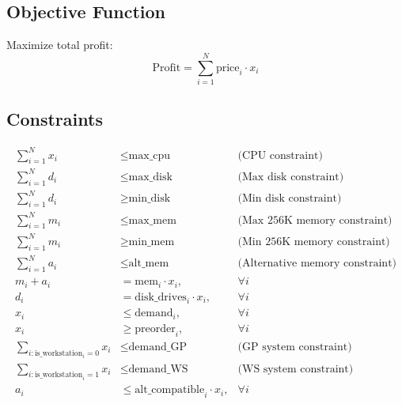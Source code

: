 \documentclass{article}
\begin{document}
\subsection*{Objective Function}
Maximize total profit:
\[
\text{Profit} = \sum_{i=1}^{N} \text{price}_i \cdot x_i
\]

\subsection*{Constraints}
\begin{align}
    \sum_{i=1}^{N} x_i &\leq \text{max\_cpu} & \text{(CPU constraint)}\\
    \sum_{i=1}^{N} d_i &\leq \text{max\_disk} & \text{(Max disk constraint)}\\
    \sum_{i=1}^{N} d_i &\geq \text{min\_disk} & \text{(Min disk constraint)}\\
    \sum_{i=1}^{N} m_i &\leq \text{max\_mem} & \text{(Max 256K memory constraint)}\\
    \sum_{i=1}^{N} m_i &\geq \text{min\_mem} & \text{(Min 256K memory constraint)}\\
    \sum_{i=1}^{N} a_i &\leq \text{alt\_mem} & \text{(Alternative memory constraint)}\\
    m_i + a_i &= \text{mem}_i \cdot x_i, & \forall i \\
    d_i &= \text{disk\_drives}_i \cdot x_i, & \forall i \\
    x_i &\leq \text{demand}_i, & \forall i \\
    x_i &\geq \text{preorder}_i, & \forall i \\
    \sum_{i:\text{is\_workstation}_i = 0} x_i &\leq \text{demand\_GP} & \text{(GP system constraint)} \\
    \sum_{i:\text{is\_workstation}_i = 1} x_i &\leq \text{demand\_WS} & \text{(WS system constraint)} \\
    a_i &\leq \text{alt\_compatible}_i \cdot x_i, & \forall i
\end{align}
\end{document}
